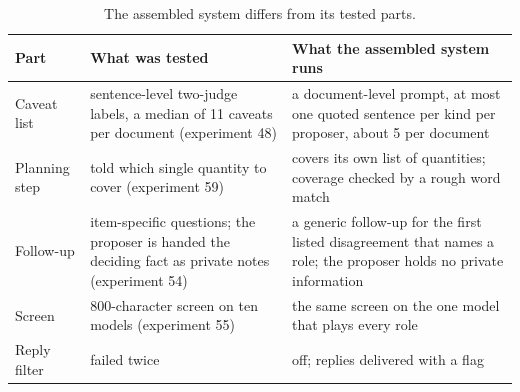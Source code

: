 \documentclass[10pt,twocolumn]{article}
\begin{document}
\begin{table}[t]
\centering\footnotesize
\setlength{\tabcolsep}{5pt}
\begin{tabular}{p{}p{}p{}}
\toprule
Part & What was tested & What the assembled system runs \\
\midrule
Caveat list & sentence-level two-judge labels, a median of 11 caveats per document (experiment 48) & a document-level prompt, at most one quoted sentence per kind per proposer, about 5 per document \\
Planning step & told which single quantity to cover (experiment 59) & covers its own list of quantities; coverage checked by a rough word match \\
Follow-up & item-specific questions; the proposer is handed the deciding fact as private notes (experiment 54) & a generic follow-up for the first listed disagreement that names a role; the proposer holds no private information \\
Screen & 800-character screen on ten models (experiment 55) & the same screen on the one model that plays every role \\
Reply filter & failed twice & off; replies delivered with a flag \\
\bottomrule
\end{tabular}
\caption{The assembled system differs from its tested parts.}
\label{tab:built}
\end{table}
\end{document}
